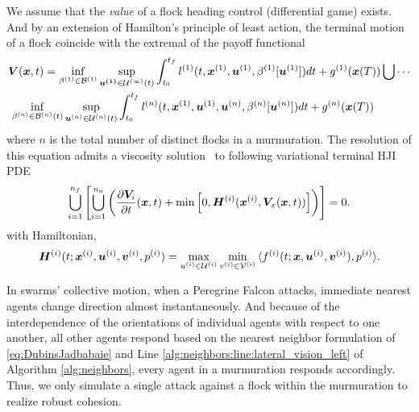 We assume that the \textit{value} of a flock heading control (differential game) exists.  And by an extension of Hamilton's principle of least action, the terminal motion of a flock coincide with the extremal of the payoff functional 
%
\begin{align}
	&\bm{V}(\bm{x}, t) = \inf_{\beta^{(1)} \in \mathcal{B}^{(1)}} \sup_{\bm{u^{(1)}} \in \mathcal{U^{(1)}}(t)} \int_{t_0}^{t_f} l^{(1)} (t, \bm{x}^{(1)}, \bm{u}^{(1)}, \beta^{(1)}[\bm{u}^{(1)}])dt +  g^{(1)}(\bm{x}(T)) \bigcup \cdots \nonumber
	\\
	&\,  \inf_{\beta^{(n)} \in \mathcal{B}^{(n)}(t)} \sup_{\bm{u}^{(n)} \in \mathcal{U}^{(n)}(t)} \int_{t_0}^{t_f} l^{(n)} (t, \bm{x}^{(1)}, \bm{u}^{(1)}, \bm{u}^{(n)}, \beta^{(n)}[\bm{u}^{(n)}])dt + g^{(n)}(\bm{x}(T))
\end{align}
%
%
where $n$ is the total number of distinct flocks in a murmuration. The resolution of this equation  admits a viscosity solution~\cite{Evans1984} to following variational terminal HJI PDE \cite{Mitchell2005}
%
\begin{align}
	\bigcup_{i=1}^{n_f}\left[\bigcup_{i=1}^{n_a}\left(\dfrac{\partial \bm{V}_i}{\partial t}(\bm{x}, t) + \min \left[0, \bm{H}^{(i)}(\bm{x}^{(i)}, \bm{V}_x(\bm{x}, t))\right]\right)\right] = 0.
	\label{eq:value_aggregate}
\end{align}
%
with Hamiltonian, 
%
\begin{align}
	\hamfunc^{(i)} (t; \state^{(i)}, \bm{u}^{(i)}, \bm{v}^{(i)}, p^{(i)}) = \max_{u^{(i)} \in \mathcal{U}^{(i)}} \min_{v^{(i)} \in \mathcal{V}^{(i)}} \, \langle f^{(i)}(t; \state, \bm{u}^{(i)}, \bm{v}^{(i)}), p^{(i)}  \rangle. %
	\label{eq:lower_visc_ham_surfaces}
\end{align}

In swarms' collective motion, when \eg a Peregrine Falcon attacks, immediate nearest agents change direction almost instantaneously. And because of the interdependence of the orientations of individual agents with respect to one another, all other agents respond based on the nearest neighbor formulation of \eqref{eq:DubinsJadbabaie} and Line \ref{alg:neighbors:line:lateral_vision_left} of Algorithm \ref{alg:neighbors}, every agent in a murmuration responds accordingly. Thus, we only simulate a single attack against a flock within the murmuration to realize robust cohesion.  

